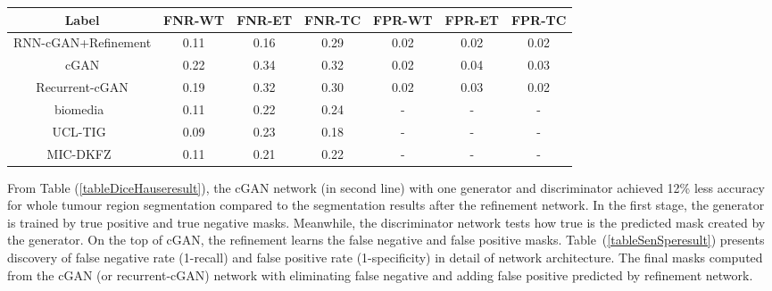 \documentclass[10pt,twocolumn,letterpaper]{article}
\begin{document}
\begin{table*}[!htbp]
\centering
\caption{Comparison and the achieved accuracy for semantic segmentation in terms of false negative rate or FNR= $1- \frac {TruePositive} {TruePositive+FalseNegative}$ and false positive rate or FPR=$1 - \frac {TrueNegative} {TrueNegative+FalsePositive}$ on validation data. The terms of WT, ET, and TC are abbreviations of whole tumor region, enhanced tumor region, and core of tumor respectively.}
\begin{tabular}{*7c} 
\toprule
Label    &  FNR-WT   & FNR-ET   & FNR-TC &  FPR-WT   & FPR-ET   & FPR-TC   \\
\midrule
RNN-cGAN+Refinement  &  0.11 & 0.16  & 0.29  & 0.02 & 0.02 & 0.02 \\
cGAN  &  0.22 & 0.34 & 0.32  &  0.02  &  0.04  & 0.03   \\
Recurrent-cGAN  &  0.19 & 0.32 & 0.30  &  0.02  &  0.03  & 0.02   \\
biomedia~\cite{pawlowski2018ensembles} &  0.11 & 0.22 & 0.24  & - & -  & - \\
UCL-TIG~\cite{wang2017automatic}& 0.09 & 0.23 & 0.18 & - & - & - \\
MIC-DKFZ~\cite{isensee2017brain} & 0.11 & 0.21 & 0.22 & - & - & - \\
\bottomrule
\end{tabular}
\label{tableSenSperesult}
\end{table*}

From Table (\ref{tableDiceHauseresult}), the cGAN network (in second line) with one generator and discriminator achieved 12\% less accuracy for whole tumour region segmentation compared to the segmentation results after the refinement network.
In the first stage, the generator is trained by true positive and true negative masks.
Meanwhile, the discriminator network tests how true is the predicted mask created by the generator.
On the top of cGAN, the refinement learns the false negative and false positive masks.
Table~(\ref{tableSenSperesult}) presents discovery of false negative rate (1-recall) and false positive rate (1-specificity) in detail of network architecture.
The final masks computed from the cGAN (or recurrent-cGAN) network with eliminating false negative and adding false positive predicted by refinement network.
\end{document}
